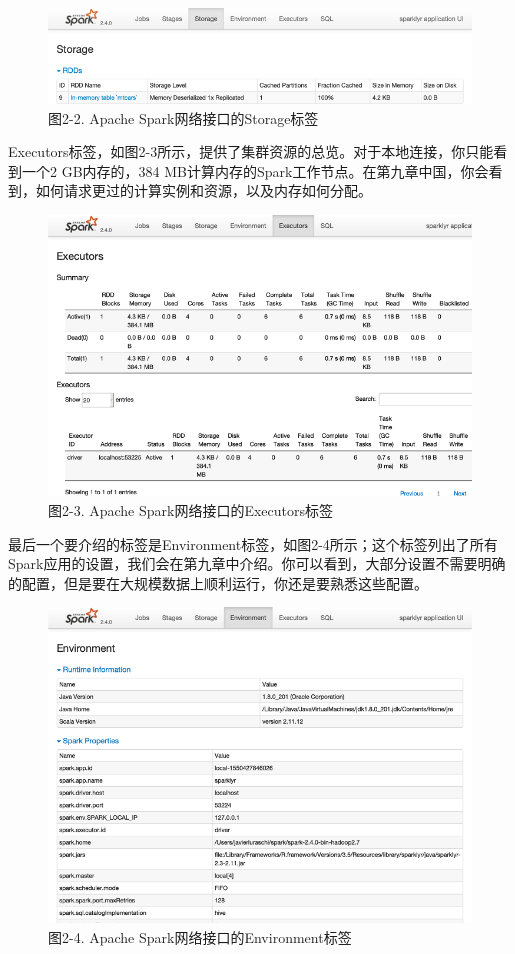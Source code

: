 \documentclass[
]{article}
\begin{document}
\begin{figure}
\centering
\includegraphics{figures/2_2.png}
\caption{图2-2. Apache Spark网络接口的Storage标签}
\end{figure}

Executors标签，如图2-3所示，提供了集群资源的总览。对于本地连接，你只能看到一个2
GB内存的，384
MB计算内存的Spark工作节点。在第九章中国，你会看到，如何请求更过的计算实例和资源，以及内存如何分配。

\begin{figure}
\centering
\includegraphics{figures/2_3.png}
\caption{图2-3. Apache Spark网络接口的Executors标签}
\end{figure}

最后一个要介绍的标签是Environment标签，如图2-4所示；这个标签列出了所有Spark应用的设置，我们会在第九章中介绍。你可以看到，大部分设置不需要明确的配置，但是要在大规模数据上顺利运行，你还是要熟悉这些配置。

\begin{figure}
\centering
\includegraphics{figures/2_4.png}
\caption{图2-4. Apache Spark网络接口的Environment标签}
\end{figure}
\end{document}
